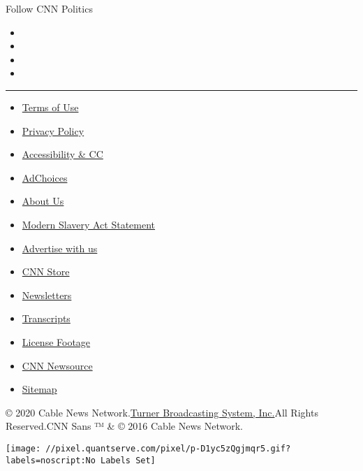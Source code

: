 Follow CNN Politics

\begin{itemize}
\item
\item
\item
\item
\end{itemize}

\begin{center}\rule{0.5\linewidth}{\linethickness}\end{center}

\begin{itemize}
\tightlist
\item
  \href{/terms}{Terms of Use}
\item
  \href{/privacy}{Privacy Policy}
\item
  \href{/accessibility}{Accessibility \& CC}
\item
  \protect\hyperlink{}{AdChoices}
\item
  \href{/about}{About Us}
\item
  \href{/msa}{Modern Slavery Act Statement}
\item
  \href{https://commercial.cnn.com}{Advertise with us}
\item
  \href{//store.cnn.com}{CNN Store}
\item
  \href{/newsletters}{Newsletters}
\item
  \href{/transcripts}{Transcripts}
\item
  \href{/collection}{License Footage}
\item
  \href{http://cnnnewsource.com}{CNN Newsource}
\item
  \href{https://www.cnn.com/sitemap.html}{Sitemap}
\end{itemize}

© 2020 Cable News Network.\href{//www.turner.com}{Turner Broadcasting
System, Inc.}All Rights Reserved.CNN Sans ™ \& © 2016 Cable News
Network.

\texttt{[image: //pixel.quantserve.com/pixel/p-D1yc5zQgjmqr5.gif?labels=noscript:No Labels Set]}
